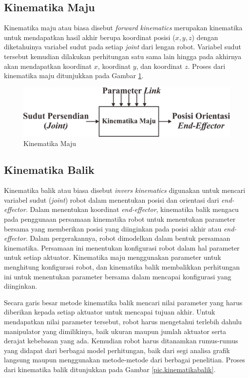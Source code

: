 \subsection{Kinematika Maju}
Kinematika maju atau biasa disebut \textit{forward kinematics} merupakan kinematika untuk mendapatkan hasil akhir berupa koordinat posisi ($x, y, z$) dengan diketahuinya variabel sudut pada setiap \textit{joint} dari lengan robot.  Variabel sudut tersebut kemudian dilakukan perhitungan satu sama lain hingga pada akhirnya akan mendapatkan koordinat $x$, koordinat $y$, dan koordinat $z$\cite{alasar}. Proses dari kinematika maju ditunjukkan pada Gambar \ref{pic.kinematikamaju}. 
\begin{figure}[H]
	\centering
	\includegraphics[width=12cm]{gambar/Kinematika_maju.png}
	\caption{Kinematika Maju}
	\label{pic.kinematikamaju}
\end{figure}


\subsection{Kinematika Balik}
Kinematika balik atau biasa disebut \textit{invers kinematics} digunakan untuk mencari variabel sudut (\textit{joint}) robot dalam menentukan posisi dan orientasi dari \textit{end-effector}. Dalam menentukan koordinat \textit{end-effector}, kinematika balik mengacu pada penggunaan persamaan kinematika robot untuk menentukan parameter bersama yang memberikan posisi yang diinginkan pada posisi akhir atau \textit{end-effector}.  Dalam pergerakannya, robot dimodelkan dalam bentuk persamaan kinematika. Persamaan ini menentukan konfigurasi robot dalam hal parameter untuk setiap aktuator. Kinematika maju menggunakan parameter untuk menghitung konfigurasi robot, dan kinematika balik membalikkan perhitungan ini untuk menentukan parameter bersama dalam mencapai konfigurasi yang diinginkan\cite{cahyono2015}. 

Secara garis besar metode kinematika balik mencari nilai parameter yang harus diberikan kepada setiap aktuator untuk mencapai tujuan akhir. Untuk mendapatkan nilai parameter tersebut, robot harus mengetahui terlebih dahulu manipulator yang dimilikinya, baik ukuran maupun jumlah aktuator serta derajat kebebasan yang ada. Kemudian robot harus ditanamkan rumus-rumus yang didapat dari berbagai model perhitungan, baik dari segi analisa grafik langsung maupun menggunakan metode-metode dari berbagai penelitian\cite{cahyono2}. Proses dari kinematika balik ditunjukkan pada Gambar \ref{pic.kinematikabalik}.

